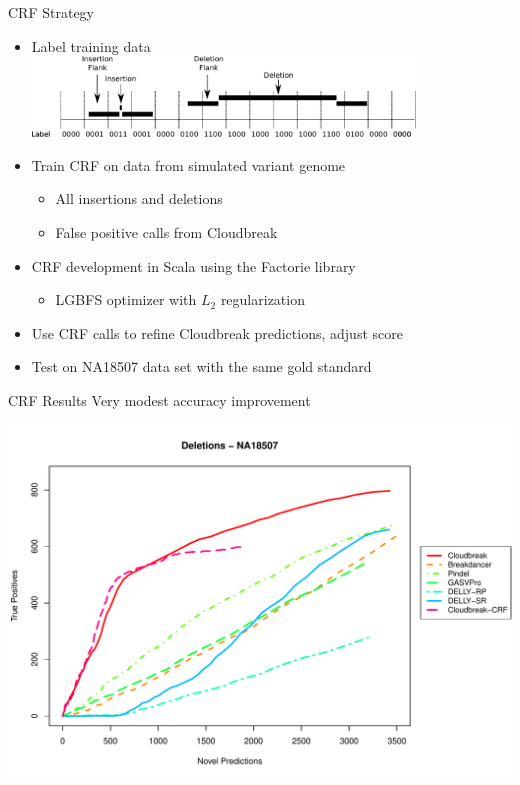 \documentclass{beamer}
\begin{document}
\begin{frame}{CRF Strategy}
  \begin{itemize}
    \item Label training data \\
\vspace{1mm}
  \includegraphics[width=0.8\textwidth,keepaspectratio]{crf_labelling.pdf}

    \item Train CRF on data from simulated variant genome
    \begin{itemize}
      \item All insertions and deletions
      \item False positive calls from Cloudbreak
    \end {itemize}
    \item CRF development in Scala using the Factorie library
    \begin{itemize}
      \item LGBFS optimizer with $L_2$ regularization
    \end{itemize}
    \item Use CRF calls to refine Cloudbreak predictions, adjust score
    \item Test on NA18507 data set with the same gold standard
  \end{itemize}
\end{frame}

\begin{frame}{CRF Results}
 Very modest accuracy improvement
 \begin{center}
   \includegraphics[height=.8\textheight,keepaspectratio]{NA18507_DELS_ROC_with_CRF.pdf}
 \end{center}
\end{frame}
\end{document}
